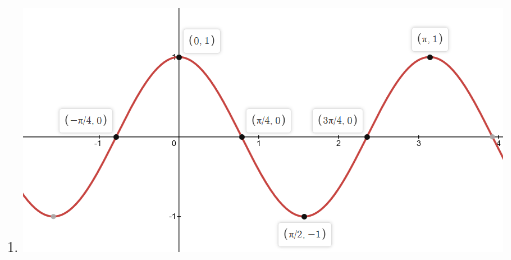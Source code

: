 \documentclass[a4paper,12pt]{article}
\begin{document}
\begin{enumerate}
    \begin{enumerate}
        \item \includegraphics[scale=0.5]{Figur2.png} 
    \end{enumerate}

\end{enumerate}
\end{document}
